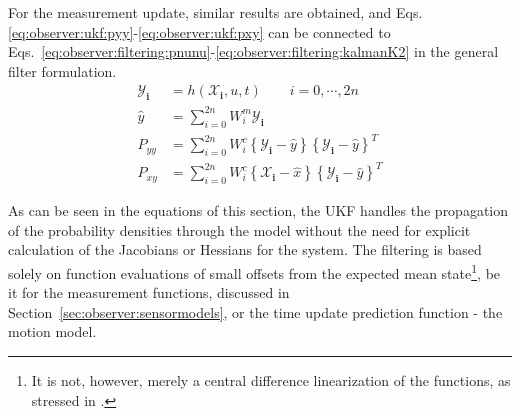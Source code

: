     For the measurement update, similar results are obtained, and Eqs.
    \eqref{eq:observer:ukf:pyy}-\eqref{eq:observer:ukf:pxy} can be connected to
    Eqs.~\eqref{eq:observer:filtering:pnunu}-\eqref{eq:observer:filtering:kalmanK2}
    in the general filter formulation.
    \begin{align}
        \mathbf{\mathcal{Y}_{i}} &= h(\mathbf{\mathcal{X}_{i}}, u, t) \qquad i = 0,\cdots,2n \\
        \hat{y} &= \sum_{i=0}^{2n}W^{m}_{i}\mathbf{\mathcal{Y}_{i}} \\
        P_{yy} &= \sum_{i=0}^{2n}W^{c}_{i}
            \left\lbrace \mathbf{\mathcal{Y}_{i}} - \hat{y} \right\rbrace
            \left\lbrace \mathbf{\mathcal{Y}_{i}} - \hat{y} \right\rbrace^{T} \label{eq:observer:ukf:pyy} \\
        P_{xy} &= \sum_{i=0}^{2n}W^{c}_{i}
            \left\lbrace \mathbf{\mathcal{X}_{i}} - \hat{x} \right\rbrace
            \left\lbrace \mathbf{\mathcal{Y}_{i}} - \hat{y} \right\rbrace^{T} \label{eq:observer:ukf:pxy}
    \end{align}

    As can be seen in the equations of this section, the UKF handles the
    propagation of the probability densities through the model without
    the need for explicit calculation of the Jacobians or Hessians for the system.
    The filtering is based solely on function evaluations of small offsets from the
    expected mean state\footnote{It is not, however, merely a central difference linearization of the functions, as stressed in \citep{Julier95anewapproach}.},
    be it for the measurement functions, discussed in
    Section~\ref{sec:observer:sensormodels}, or the time update
    prediction function - the motion model.
